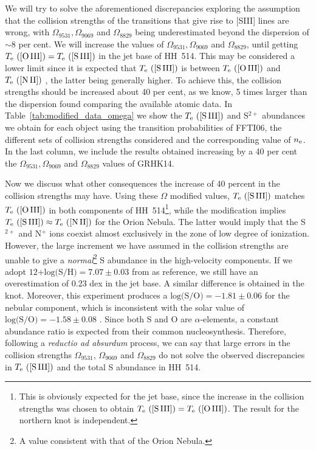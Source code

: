\documentclass[fleqn,usenatbib]{mnras}
\begin{document}
We will try to solve the aforementioned discrepancies exploring the assumption that the collision strengths of the transitions that give rise to [S\thinspace III] lines are wrong, with $\Omega_{9531}, \Omega_{9069}$ and $\Omega_{8829}$ being underestimated beyond the dispersion of $\sim8$ per cent. We will increase the values of $\Omega_{9531}, \Omega_{9069}$ and $\Omega_{8829}$, until getting $T_{\rm e} \text{ ([O\thinspace III])}=T_{\rm e} \text{ ([S\thinspace III])} $ in the jet base of HH~514. This may be considered a lower limit since it is expected that $T_{\rm e} \text{ ([S\thinspace III])} $ is between $T_{\rm e} \text{ ([O\thinspace III])} $ and $T_{\rm e} \text{ ([N\thinspace II])} $ \citep[][]{Berg20}, the latter being generally higher. To achieve this, the collision strengths should be increased about 40 per cent, as we know, 5 times larger than the dispersion found comparing the available atomic data. In Table~\ref{tab:modified_data_omega} we show the $T_{\rm e} \text{ ([S\thinspace III])} $ and  S$^{2+}$ abundances we obtain for each object using the transition probabilities of FFTI06, the different sets of collision strengths considered and the corresponding value of $n_{\rm e}$. In the last column, we include the results obtained increasing by a 40 per cent the $\Omega_{9531}, \Omega_{9069}$ and $\Omega_{8829}$ values of GRHK14. 

Now we discuss what other consequences the increase of 40 percent in the collision strengths may have. Using these $\Omega$ modified values, $T_{\rm e} \text{ ([S\thinspace III])}$ matches $T_{\rm e} \text{ ([O\thinspace III])}$ in both components of HH~514\footnote{This is obviously expected for the jet base, since the increase in the collision strengths was chosen to obtain $T_{\rm e} \text{ ([S\thinspace III])}= T_{\rm e} \text{ ([O\thinspace III])}$. The result for the northern knot is independent.}, while the modification implies $T_{\rm e} \text{ ([S\thinspace III])}\approx T_{\rm e} \text{ ([N\thinspace II])}$ for the Orion Nebula. The latter would imply that the S$^{2+}$ and N$^{+}$ ions coexist almost exclusively in the zone of low degree of ionization. However, the large increment we have assumed in the collision strengths are unable to give a \textit{normal}\footnote{A value consistent with that of the Orion Nebula.} S abundance in the high-velocity components. If we adopt $\text{12+log(S/H)}=7.07 \pm 0.03$ from \citet{mendez2021-2} as reference, we still have an overestimation of 0.23 dex in the jet base. A similar difference is obtained in the knot. Moreover, this experiment produces a $\text{log(S/O)} = -1.81 \pm 0.06$ for the nebular component, which is inconsistent with the solar value of $\text{log(S/O)}=-1.58 \pm 0.08$ \citep{lodders19}. Since both S and O are $\alpha$-elements, a constant abundance ratio is expected from their common nucleosynthesis. Therefore, following a \textit{reductio ad absurdum} process, we can say that large errors in the collision strengths $\Omega_{9531}$, $\Omega_{9069}$ and $\Omega_{8829}$ do not solve the observed discrepancies in  $T_{\rm e} \text{ ([S\thinspace III])}$ and the total S abundance in HH~514.
\end{document}
